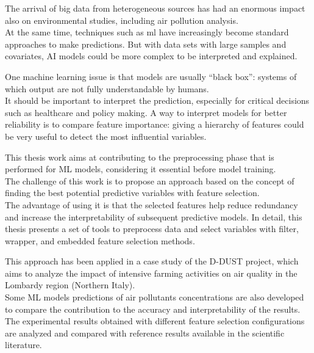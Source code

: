 The arrival of big data from heterogeneous sources has had an enormous impact also on environmental studies, including air pollution analysis.\\
At the same time, techniques such as \gls{ml} have increasingly become standard approaches to make predictions. But with data sets with large samples and covariates, AI models could be more complex to be interpreted and explained.\par
One machine learning issue is that models are usually “black box”: systems of which output are not fully understandable by humans. \\
It should be important to interpret the prediction, especially for critical decisions such as healthcare and policy making.
A way to interpret models for better reliability is to compare feature importance: giving a hierarchy of features could be very useful to detect the most influential variables.\par
This thesis work aims at contributing to the preprocessing phase that is performed for ML models, considering it essential before model training.\\
The challenge of this work is to propose an approach based on the concept of finding the best potential predictive variables with feature selection.\\
The advantage of using it is that the selected features help reduce redundancy and increase the interpretability of subsequent predictive models.
In detail, this thesis presents a set of tools to preprocess data and select variables with filter, wrapper, and embedded feature selection methods.\par
This approach has been applied in a case study of the D-DUST project, which aims to analyze the impact of intensive farming activities on air quality in the Lombardy region (Northern Italy).\\
Some ML models predictions of air pollutants concentrations are also developed to compare the contribution to the accuracy and interpretability of the results.\\
The experimental results obtained with different feature selection configurations are analyzed and compared with reference results available in the scientific literature.
\\
\\